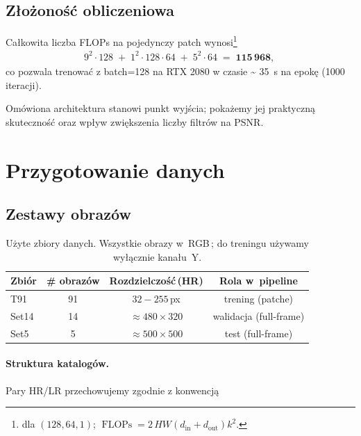 \documentclass[11pt]{article}
\begin{document}
\subsection{Złożoność obliczeniowa}

Całkowita liczba FLOPs na pojedynczy patch
wynosi\footnote{
dla $(128,64,1)$; $\operatorname{FLOPs}=2\,HW(d_\text{in}+d_\text{out})k^2$.}
\begin{align*}
  &9^2\cdot128 \;+\;
   1^2\cdot128\cdot64 \;+\;
   5^2\cdot64   \;=\; \mathbf{115\,968}, \quad%
\end{align*}
co pozwala trenować z batch=\num{128} na RTX 2080 w czasie \textasciitilde\!%
\SI{35}{\second} na epokę (\num{1000} iteracji).


\bigskip
Omówiona architektura stanowi punkt wyjścia; 
pokażemy jej praktyczną skuteczność oraz wpływ zwiększenia liczby filtrów
na PSNR.

\section{Przygotowanie danych}
\label{sec:data}

\subsection{Zestawy obrazów}

\begin{table}[h]
\centering
\begin{tabular}{@{}lccc@{}}
\toprule
Zbiór   & \# obrazów & Rozdzielczość\,(HR) & Rola w~pipeline \\ \midrule
T91     & 91 & $32\!-\!255$\,px & trening (patche) \\
Set14   & 14 & $\approx 480\!\times\!320$ & walidacja (full-frame) \\
Set5    & 5  & $\approx 500\!\times\!500$ & test (full-frame) \\ \bottomrule
\end{tabular}
\caption{Użyte zbiory danych.  Wszystkie obrazy w~RGB\,; do treningu używamy wyłącznie kanału~Y.}
\label{tab:datasets}
\end{table}

\paragraph{Struktura katalogów.}
Pary HR/LR przechowujemy zgodnie z konwencją
\end{document}
